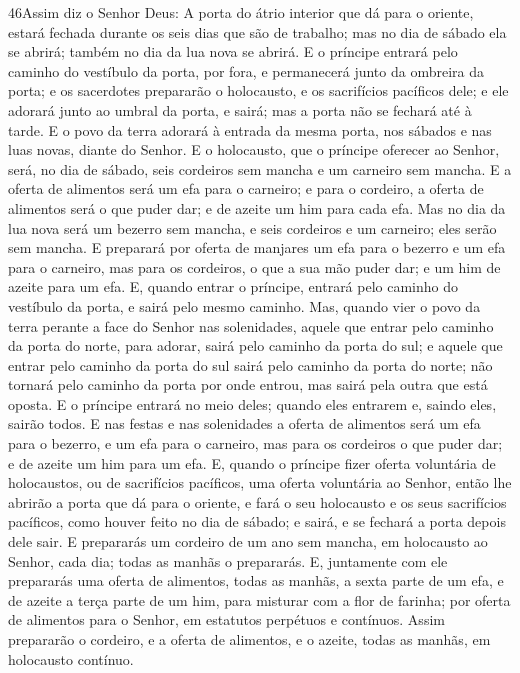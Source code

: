 \lettrine{46} Assim diz o Senhor Deus: A porta do átrio
interior que dá para o oriente, estará fechada durante os seis dias
que são de trabalho; mas no dia de sábado ela se abrirá; também no
dia da lua nova se abrirá. E o príncipe entrará pelo caminho do
vestíbulo da porta, por fora, e permanecerá junto da ombreira da
porta; e os sacerdotes prepararão o holocausto, e os sacrifícios
pacíficos dele; e ele adorará junto ao umbral da porta, e sairá; mas
a porta não se fechará até à tarde. E o povo da terra adorará à
entrada da mesma porta, nos sábados e nas luas novas, diante do
Senhor. E o holocausto, que o príncipe oferecer ao Senhor, será,
no dia de sábado, seis cordeiros sem mancha e um carneiro sem
mancha. E a oferta de alimentos será um efa para o carneiro; e
para o cordeiro, a oferta de alimentos será o que puder dar; e de
azeite um him para cada efa. Mas no dia da lua nova será um
bezerro sem mancha, e seis cordeiros e um carneiro; eles serão sem
mancha. E preparará por oferta de manjares um efa para o bezerro
e um efa para o carneiro, mas para os cordeiros, o que a sua mão
puder dar; e um him de azeite para um efa. E, quando entrar o
príncipe, entrará pelo caminho do vestíbulo da porta, e sairá pelo
mesmo caminho. Mas, quando vier o povo da terra perante a face
do Senhor nas solenidades, aquele que entrar pelo caminho da porta
do norte, para adorar, sairá pelo caminho da porta do sul; e aquele
que entrar pelo caminho da porta do sul sairá pelo caminho da porta
do norte; não tornará pelo caminho da porta por onde entrou, mas
sairá pela outra que está oposta. E o príncipe entrará no
meio deles; quando eles entrarem e, saindo eles, sairão todos.
E nas festas e nas solenidades a oferta de alimentos será um
efa para o bezerro, e um efa para o carneiro, mas para os cordeiros
o que puder dar; e de azeite um him para um efa. E, quando o
príncipe fizer oferta voluntária de holocaustos, ou de sacrifícios
pacíficos, uma oferta voluntária ao Senhor, então lhe abrirão a
porta que dá para o oriente, e fará o seu holocausto e os seus
sacrifícios pacíficos, como houver feito no dia de sábado; e sairá,
e se fechará a porta depois dele sair. E prepararás um
cordeiro de um ano sem mancha, em holocausto ao Senhor, cada dia;
todas as manhãs o prepararás. E, juntamente com ele
prepararás uma oferta de alimentos, todas as manhãs, a sexta parte
de um efa, e de azeite a terça parte de um him, para misturar com a
flor de farinha; por oferta de alimentos para o Senhor, em estatutos
perpétuos e contínuos. Assim prepararão o cordeiro, e a
oferta de alimentos, e o azeite, todas as manhãs, em holocausto
contínuo.

